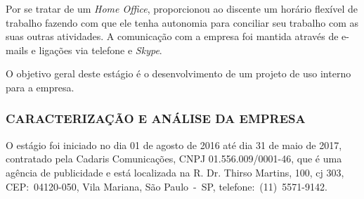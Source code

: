 \documentclass[
  12pt,            %
  openany,
  oneside,
  a4paper,         %
  english,      %
  brazil
]{article}
\numberwithin{figure}{section}
\numberwithin{table}{section}
\begin{document}
Por se tratar de um \textit{Home Office}, proporcionou ao discente um horário flexível de trabalho fazendo com que ele tenha autonomia para conciliar seu trabalho com as suas outras atividades. A comunicação com a empresa foi mantida através de e-mails e ligações via telefone e \textit{Skype}.

O objetivo geral deste estágio é o desenvolvimento de um projeto de uso interno para a empresa.


\subsubsection{CARACTERIZAÇÃO E ANÁLISE DA EMPRESA}




O estágio foi iniciado no dia 01 de agosto de 2016 até dia 31 de maio de 2017, contratado pela Cadaris Comunicações, CNPJ 01.556.009/0001-46, que é uma agência de publicidade e está localizada na R. Dr. Thirso Martins, 100, cj 303, CEP:~04120-050, Vila Mariana, São Paulo~-~SP, telefone:~(11)~5571-9142.
\end{document}
